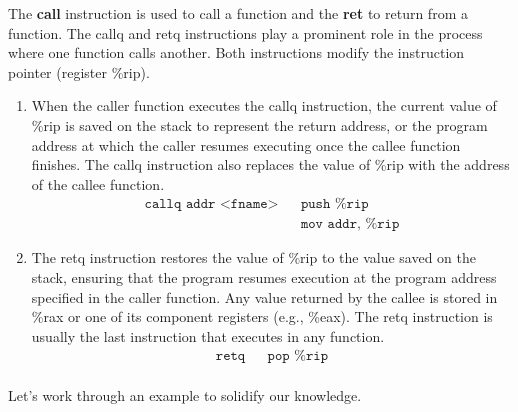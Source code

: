 \documentclass{article}
\begin{document}
      \begin{definition}
        The \textbf{call} instruction is used to call a function and the \textbf{ret} to return from a function. The callq and retq instructions play a prominent role in the process where one function calls another. Both instructions modify the instruction pointer (register \%rip). 

        \begin{enumerate}
          \item When the caller function executes the callq instruction, the current value of \%rip is saved on the stack to represent the return address, or the program address at which the caller resumes executing once the callee function finishes. The callq instruction also replaces the value of \%rip with the address of the callee function. 
            \begin{align*}
              \texttt{callq addr <fname>} && \texttt{push \%rip} \\
                                          && \texttt{mov addr, \%rip}
            \end{align*}
          \item The retq instruction restores the value of \%rip to the value saved on the stack, ensuring that the program resumes execution at the program address specified in the caller function. Any value returned by the callee is stored in \%rax or one of its component registers (e.g., \%eax). The retq instruction is usually the last instruction that executes in any function.
            \begin{align*}
              \texttt{retq} && \texttt{pop \%rip} \\
            \end{align*}
        \end{enumerate}
      \end{definition}

      Let's work through an example to solidify our knowledge. 
\end{document}
